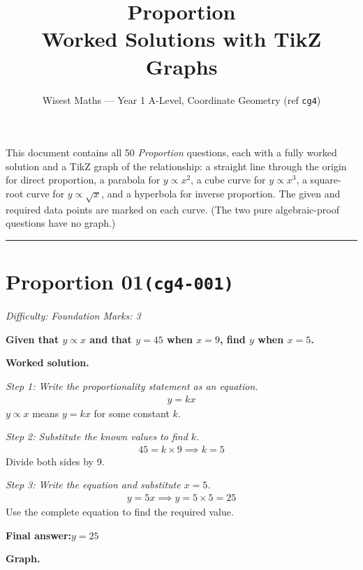 \documentclass[11pt]{article}
\title{\textbf{Proportion}\\[0.3em]\large Worked Solutions with TikZ Graphs}
\author{Wisest Maths --- Year 1 A-Level, Coordinate Geometry (ref \texttt{cg4})}
\date{}
\newcommand{\question}[1]{\par\medskip\noindent\textbf{#1}\par}
\begin{document}
\maketitle
\noindent This document contains all 50 \emph{Proportion} questions, each with a fully worked
solution and a TikZ graph of the relationship: a straight line through the origin for direct proportion,
a parabola for $y \propto x^{2}$, a cube curve for $y \propto x^{3}$, a square-root curve for
$y \propto \sqrt{x}$, and a hyperbola for inverse proportion. The given and required data points are marked
on each curve. (The two pure algebraic-proof questions have no graph.)
\tableofcontents
\bigskip
\hrule

\section*{Proportion 01\quad\small\texttt{(cg4-001)}}
\textit{Difficulty: Foundation \quad\textbar\quad Marks: 3}

\question{Given that \( y \propto x \) and that \( y = 45 \) when \( x = 9 \), find \( y \) when \( x = 5 \).}

\textbf{Worked solution.}

\textit{Step 1: Write the proportionality statement as an equation.}
\[\begin{gathered}
y = kx
\end{gathered}\]
\( y \propto x \) means \( y = kx \) for some constant \( k \).

\textit{Step 2: Substitute the known values to find \( k \).}
\[\begin{gathered}
45 = k \times 9 \implies k = 5
\end{gathered}\]
Divide both sides by 9.

\textit{Step 3: Write the equation and substitute \( x = 5 \).}
\[\begin{gathered}
y = 5x \implies y = 5 \times 5 = 25
\end{gathered}\]
Use the complete equation to find the required value.

\begin{answerbox}
\textbf{Final answer:}\quad \(\displaystyle  y = 25 \)
\end{answerbox}
\textbf{Graph.}
\end{document}
